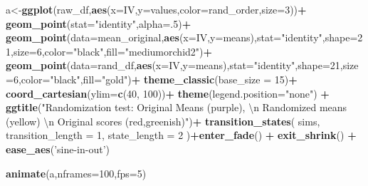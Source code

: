 \documentclass[]{book}
\newenvironment{Shaded}{\begin{snugshade}}{\end{snugshade}}
\newcommand{\CharTok}[1]{\textcolor[rgb]{0.31,0.60,0.02}{#1}}
\newcommand{\DataTypeTok}[1]{\textcolor[rgb]{0.13,0.29,0.53}{#1}}
\newcommand{\DecValTok}[1]{\textcolor[rgb]{0.00,0.00,0.81}{#1}}
\newcommand{\KeywordTok}[1]{\textcolor[rgb]{0.13,0.29,0.53}{\textbf{#1}}}
\newcommand{\NormalTok}[1]{#1}
\newcommand{\OperatorTok}[1]{\textcolor[rgb]{0.81,0.36,0.00}{\textbf{#1}}}
\newcommand{\StringTok}[1]{\textcolor[rgb]{0.31,0.60,0.02}{#1}}
\begin{document}
\begin{Shaded}
\begin{Highlighting}[]
\NormalTok{a<-}\KeywordTok{ggplot}\NormalTok{(raw_df,}\KeywordTok{aes}\NormalTok{(}\DataTypeTok{x=}\NormalTok{IV,}\DataTypeTok{y=}\NormalTok{values,}\DataTypeTok{color=}\NormalTok{rand_order,}\DataTypeTok{size=}\DecValTok{3}\NormalTok{))}\OperatorTok{+}
\StringTok{  }\KeywordTok{geom_point}\NormalTok{(}\DataTypeTok{stat=}\StringTok{"identity"}\NormalTok{,}\DataTypeTok{alpha=}\NormalTok{.}\DecValTok{5}\NormalTok{)}\OperatorTok{+}
\StringTok{  }\KeywordTok{geom_point}\NormalTok{(}\DataTypeTok{data=}\NormalTok{mean_original,}\KeywordTok{aes}\NormalTok{(}\DataTypeTok{x=}\NormalTok{IV,}\DataTypeTok{y=}\NormalTok{means),}\DataTypeTok{stat=}\StringTok{"identity"}\NormalTok{,}\DataTypeTok{shape=}\DecValTok{21}\NormalTok{,}\DataTypeTok{size=}\DecValTok{6}\NormalTok{,}\DataTypeTok{color=}\StringTok{"black"}\NormalTok{,}\DataTypeTok{fill=}\StringTok{"mediumorchid2"}\NormalTok{)}\OperatorTok{+}
\StringTok{  }\KeywordTok{geom_point}\NormalTok{(}\DataTypeTok{data=}\NormalTok{rand_df,}\KeywordTok{aes}\NormalTok{(}\DataTypeTok{x=}\NormalTok{IV,}\DataTypeTok{y=}\NormalTok{means),}\DataTypeTok{stat=}\StringTok{"identity"}\NormalTok{,}\DataTypeTok{shape=}\DecValTok{21}\NormalTok{,}\DataTypeTok{size=}\DecValTok{6}\NormalTok{,}\DataTypeTok{color=}\StringTok{"black"}\NormalTok{,}\DataTypeTok{fill=}\StringTok{"gold"}\NormalTok{)}\OperatorTok{+}
\StringTok{  }\KeywordTok{theme_classic}\NormalTok{(}\DataTypeTok{base_size =} \DecValTok{15}\NormalTok{)}\OperatorTok{+}
\StringTok{  }\KeywordTok{coord_cartesian}\NormalTok{(}\DataTypeTok{ylim=}\KeywordTok{c}\NormalTok{(}\DecValTok{40}\NormalTok{, }\DecValTok{100}\NormalTok{))}\OperatorTok{+}
\StringTok{  }\KeywordTok{theme}\NormalTok{(}\DataTypeTok{legend.position=}\StringTok{"none"}\NormalTok{) }\OperatorTok{+}
\StringTok{  }\KeywordTok{ggtitle}\NormalTok{(}\StringTok{"Randomization test: Original Means (purple), }
\StringTok{          }\CharTok{\textbackslash{}n}\StringTok{ Randomized means (yellow)}
\StringTok{          }\CharTok{\textbackslash{}n}\StringTok{ Original scores (red,greenish)"}\NormalTok{)}\OperatorTok{+}
\StringTok{  }\KeywordTok{transition_states}\NormalTok{(}
\NormalTok{    sims,}
    \DataTypeTok{transition_length =} \DecValTok{1}\NormalTok{,}
    \DataTypeTok{state_length =} \DecValTok{2}
\NormalTok{  )}\OperatorTok{+}\KeywordTok{enter_fade}\NormalTok{() }\OperatorTok{+}\StringTok{ }
\StringTok{  }\KeywordTok{exit_shrink}\NormalTok{() }\OperatorTok{+}
\StringTok{  }\KeywordTok{ease_aes}\NormalTok{(}\StringTok{'sine-in-out'}\NormalTok{)}

\KeywordTok{animate}\NormalTok{(a,}\DataTypeTok{nframes=}\DecValTok{100}\NormalTok{,}\DataTypeTok{fps=}\DecValTok{5}\NormalTok{)}
\end{Highlighting}
\end{Shaded}
\end{document}
